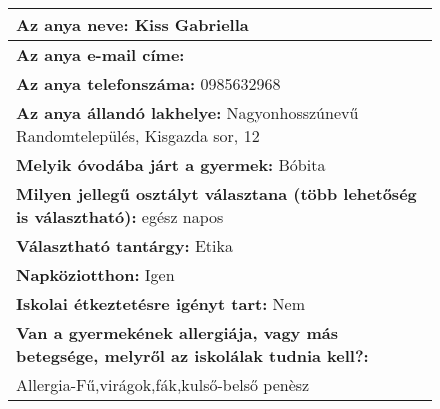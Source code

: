 \documentclass[10pt,a4paper]{article}
\begin{document}
\begin{figure}[!ht]
\begin{tabular}{|m{\textwidth}|}
\hline\vspace{3pt}
\textbf{Az anya neve:} \hspace{0.5cm} Kiss Gabriella \vspace{3pt} \\
\hline\vspace{3pt}
\textbf{Az anya e-mail címe:} \hspace{0.5cm}   \vspace{3pt} \\
\hline\vspace{3pt}
\textbf{Az anya telefonszáma:} \hspace{0.5cm} 0985632968 \vspace{3pt} \\
\hline\vspace{3pt}
\textbf{Az anya állandó lakhelye:} \hspace{0.5cm} Nagyonhosszúnevű Randomtelepülés, Kisgazda sor, 12 \vspace{3pt} \\
\hline\vspace{3pt}
\textbf{Melyik óvodába járt a gyermek:} \hspace{0.5cm} Bóbita \vspace{3pt} \\
\hline\vspace{3pt}
\textbf{Milyen jellegű osztályt választana (több lehetőség is választható):} \hspace{0.5cm} egész napos \vspace{3pt} \\
\hline\vspace{3pt}
\textbf{Választható tantárgy:} \hspace{0.5cm} Etika \vspace{3pt} \\
\hline\vspace{3pt}
\textbf{Napköziotthon:} \hspace{0.5cm} Igen \vspace{3pt} \\
\hline\vspace{3pt}
\textbf{Iskolai étkeztetésre igényt tart:} \hspace{0.5cm} Nem \vspace{3pt} \\
\hline\vspace{3pt}
\textbf{Van a gyermekének allergiája, vagy más betegsége, melyről az iskolálak tudnia kell?:} \\ \hspace{0.5cm} Allergia-Fű,virágok,fák,kulső-belső penèsz \vspace{3pt} \\

\end{tabular}
\end{figure}
\end{document}
